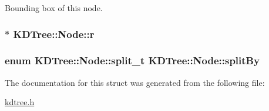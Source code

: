 Bounding box of this node. 

\subsubsection[{\texorpdfstring{r}{r}}]{ $\ast$ K\+D\+Tree\+::\+Node\+::r}\hypertarget{structKDTree_1_1Node_a1ee516a9562dc5c6f53ad1176c2016a4}{}\label{structKDTree_1_1Node_a1ee516a9562dc5c6f53ad1176c2016a4}
\subsubsection[{\texorpdfstring{split\+By}{splitBy}}]{\setlength{\rightskip}{0pt plus 5cm}enum {\bf K\+D\+Tree\+::\+Node\+::split\+\_\+t}  K\+D\+Tree\+::\+Node\+::split\+By}\hypertarget{structKDTree_1_1Node_a6ab2edd3f12f7e2f547c55d219252469}{}\label{structKDTree_1_1Node_a6ab2edd3f12f7e2f547c55d219252469}


The documentation for this struct was generated from the following file\+:\begin{DoxyCompactItemize}
\item 
\hyperlink{kdtree_8h}{kdtree.\+h}\end{DoxyCompactItemize}
